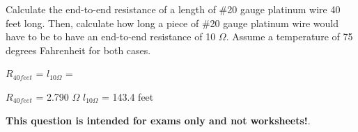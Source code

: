 

Calculate the end-to-end resistance of a length of \#20 gauge platinum wire 40 feet long.  Then, calculate how long a piece of \#20 gauge platinum wire would have to be to have an end-to-end resistance of 10 $\Omega$.  Assume a temperature of 75 degrees Fahrenheit for both cases.

\vskip 10pt

$R_{40feet}$ = \hskip 150pt $l_{10\Omega}$ = 







$R_{40feet}$ = 2.790 $\Omega$ \hskip 100pt $l_{10\Omega}$ = 143.4 feet







{\bf This question is intended for exams only and not worksheets!}.



